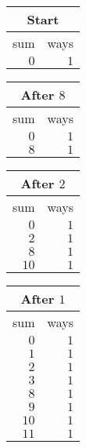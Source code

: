  \begin{center}\linespread{1}\selectfont
	\begin{tabular}[t]{r|r}
		\multicolumn{2}{c}{Start}\\\hline
		sum	& ways\\\hline
		$0$	& $1$
	\end{tabular}
	\begin{tabular}[t]{r|r}
		\multicolumn{2}{c}{After $8$}\\\hline
		sum	& ways\\\hline
		$0$	& $1$\\
		$8$	& $1$
	\end{tabular}
	\begin{tabular}[t]{r|r}
		\multicolumn{2}{c}{After $2$}\\\hline
		sum	& ways\\\hline
		$0$	& $1$\\
		$2$	& $1$\\
		$8$	& $1$\\
		$10$	& $1$
	\end{tabular}
	\begin{tabular}[t]{r|r}
		\multicolumn{2}{c}{After $1$}\\\hline
		sum	& ways\\\hline
		$0$	& $1$\\
		$1$	& $1$\\
		$2$	& $1$\\
		$3$	& $1$\\
		$8$	& $1$\\
		$9$	& $1$\\
		$10$	& $1$\\
		$11$	& $1$
	\end{tabular}
\end{center}